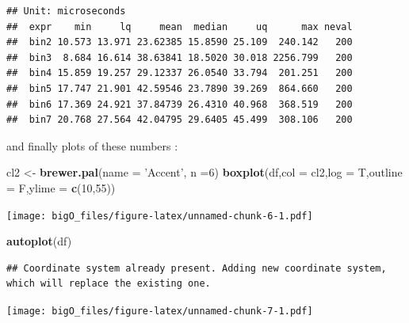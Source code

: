 \documentclass[]{article}
\newenvironment{Shaded}{\begin{snugshade}}{\end{snugshade}}
\newcommand{\KeywordTok}[1]{\textcolor[rgb]{0.13,0.29,0.53}{\textbf{#1}}}
\newcommand{\DataTypeTok}[1]{\textcolor[rgb]{0.13,0.29,0.53}{#1}}
\newcommand{\DecValTok}[1]{\textcolor[rgb]{0.00,0.00,0.81}{#1}}
\newcommand{\StringTok}[1]{\textcolor[rgb]{0.31,0.60,0.02}{#1}}
\newcommand{\NormalTok}[1]{#1}
\begin{document}
\begin{verbatim}
## Unit: microseconds
##  expr    min     lq     mean  median     uq      max neval
##  bin2 10.573 13.971 23.62385 15.8590 25.109  240.142   200
##  bin3  8.684 16.614 38.63841 18.5020 30.018 2256.799   200
##  bin4 15.859 19.257 29.12337 26.0540 33.794  201.251   200
##  bin5 17.747 21.901 42.59546 23.7890 39.269  864.660   200
##  bin6 17.369 24.921 37.84739 26.4310 40.968  368.519   200
##  bin7 20.768 27.564 42.04795 29.6405 45.499  308.106   200
\end{verbatim}

and finally plots of these numbers :

\begin{Shaded}
\begin{Highlighting}[]
\NormalTok{cl2 <-}\StringTok{ }\KeywordTok{brewer.pal}\NormalTok{(}\DataTypeTok{name =} \StringTok{'Accent'}\NormalTok{, }\DataTypeTok{n =}\DecValTok{6}\NormalTok{)}
\KeywordTok{boxplot}\NormalTok{(df,}\DataTypeTok{col =}\NormalTok{ cl2,}\DataTypeTok{log =}\NormalTok{ T,}\DataTypeTok{outline =}\NormalTok{ F,}\DataTypeTok{ylime =} \KeywordTok{c}\NormalTok{(}\DecValTok{10}\NormalTok{,}\DecValTok{55}\NormalTok{))}
\end{Highlighting}
\end{Shaded}

\texttt{[image: bigO\_files/figure-latex/unnamed-chunk-6-1.pdf]}

\begin{Shaded}
\begin{Highlighting}[]
\KeywordTok{autoplot}\NormalTok{(df)}
\end{Highlighting}
\end{Shaded}

\begin{verbatim}
## Coordinate system already present. Adding new coordinate system, which will replace the existing one.
\end{verbatim}

\texttt{[image: bigO\_files/figure-latex/unnamed-chunk-7-1.pdf]}
\end{document}
